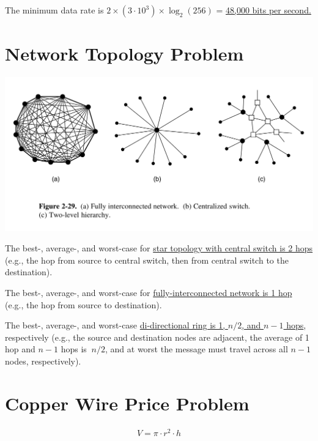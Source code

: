 The minimum data rate is $2 \times (3 \cdot 10^3) \times \log_2(256)$ = \ul{48,000 bits per second.}




\section{Network Topology Problem}

\includegraphics[width=\the\columnwidth]{network-topologies.png}

The best-, average-, and worst-case for \ul{star topology with central switch is 2 hops} (e.g., the hop from source to central switch, then from central switch to the destination).

The best-, average-, and worst-case for \ul{fully-interconnected network is 1 hop} (e.g., the hop from source to destination).

The best-, average-, and worst-case \ul{di-directional ring is 1, $n / 2$, and $n - 1$ hops}, respectively (e.g., the source and destination nodes are adjacent, the average of 1 hop and $n - 1$ hops is $~ n/2$, and at worst the message must travel across all $n - 1$ nodes, respectively).

\clearpage
\section{Copper Wire Price Problem}
\begin{align*}
	V = \pi \cdot r^2 \cdot h
\end{align*}

